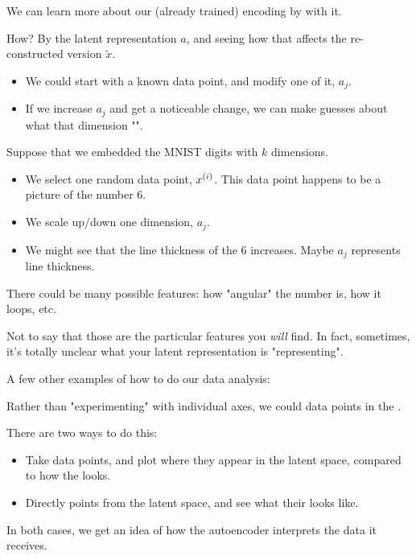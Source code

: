         \begin{concept}
            We can learn more about our (already trained) encoding by  with it.

            How? By  the latent representation $a$, and seeing how that affects the re-constructed version $\tilde{x}$.

            

            \begin{itemize}
                \item We could start with a known data point, and modify one  of it, $a_j$. 
                \item If we increase $a_j$ and get a noticeable change, we can make guesses about what that dimension "".
            \end{itemize}
        \end{concept}

        \miniex Suppose that we embedded the MNIST digits with $k$ dimensions.

        \begin{itemize}
            \item We select one random data point, $x^{(i)}$. This data point happens to be a picture of the number 6.
            \item We scale up/down one dimension, $a_j$.
            \item We might see that the line thickness of the 6 increases. Maybe $a_j$ represents line thickness.
        \end{itemize}

        There could be many possible features: how "angular" the number is, how it loops, etc.

        Not to say that those are the particular features you \textit{will} find. In fact, sometimes, it's totally unclear what your latent representation is "representing".

        \subsecdiv

        A few other examples of how to do our data analysis:\\

        \begin{concept}
            Rather than "experimenting" with individual axes, we could  data points in the .

            There are two ways to do this:

            \begin{itemize}
                \item Take  data points, and plot where they appear in the latent space, compared to how the  looks.

                \item Directly  points from the latent space, and see what their  looks like.
            \end{itemize}

            In both cases, we get an idea of how the autoencoder interprets the data it receives.
        \end{concept}

